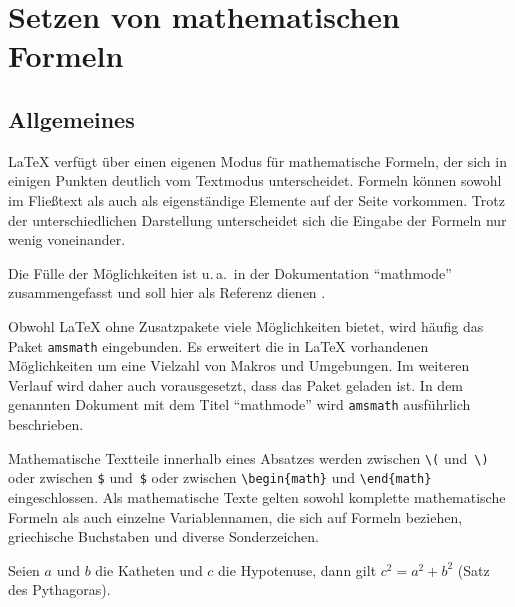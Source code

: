 

\section{Setzen von mathematischen Formeln} \label{math}


\subsection{Allgemeines}

\LaTeX{} verfügt über einen eigenen Modus für mathematische Formeln, der sich
in einigen Punkten deutlich vom Textmodus unterscheidet. Formeln können sowohl
im Fließtext als auch als eigenständige Elemente auf der Seite vorkommen.
Trotz der unterschiedlichen Darstellung  unterscheidet sich die Eingabe der
Formeln nur wenig voneinander.

Die Fülle der Möglichkeiten ist u.\,a.\ in der Dokumentation \enquote{mathmode}
zusammengefasst und soll hier als Referenz dienen \cite{mathmode}.

Obwohl \LaTeX{} ohne Zusatzpakete viele Möglichkeiten bietet, wird häufig
das Paket \texttt{amsmath} eingebunden. Es erweitert die in \LaTeX{}
vorhandenen Möglichkeiten  um eine Vielzahl von Makros und Umgebungen. Im
weiteren Verlauf wird daher auch vorausgesetzt, dass das Paket geladen ist. In
dem genannten Dokument mit dem Titel \enquote{mathmode} wird \texttt{amsmath}
ausführlich beschrieben.
 
Mathematische Textteile innerhalb eines Absatzes werden zwischen
\lstinline|\(| und~\lstinline|\)| oder zwischen \lstinline|$| und~\lstinline|$| oder
zwischen \lstinline|\begin{math}| und \lstinline|\end{math}|
eingeschlossen.
Als mathematische Texte gelten sowohl komplette mathematische
Formeln als auch einzelne Variablennamen, die sich auf Formeln
beziehen, griechische Buchstaben und diverse Sonderzeichen.

\begin{LTXexample}
Seien $a$ und $b$ die Katheten
und $c$ die Hypotenuse,
dann gilt $c^{2}=a^{2}+b^{2}$
(Satz des Pythagoras).
\end{LTXexample}


